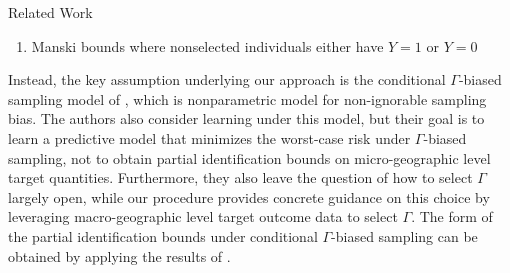\begin{subsection}{Related Work}
\begin{enumerate}
    \item \citet{manski2016credible} Manski bounds where nonselected individuals either have $Y=1$ or $Y=0$
\end{enumerate}

	Instead, the key assumption underlying our approach is the conditional $\Gamma$-biased sampling model of \citet{sahoo2022learning}, which is nonparametric model for non-ignorable sampling bias. The authors also consider learning under this model, but their goal is to learn a predictive model that minimizes the worst-case risk under $\Gamma$-biased sampling, not to obtain partial identification bounds on micro-geographic level target quantities. Furthermore, they also leave the question of how to select $\Gamma$ largely open, while our procedure provides concrete guidance on this choice by leveraging macro-geographic level target outcome data to select $\Gamma$. The form of the partial identification bounds under conditional $\Gamma$-biased sampling can be obtained by applying the results of \citet{dorn2024doubly,rockafellar2000optimization}.
\end{subsection}





